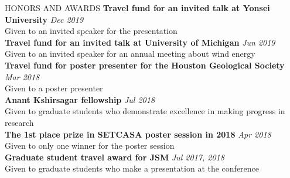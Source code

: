 \documentclass{resume} %
\begin{document}
\begin{rSection}{HONORS AND AWARDS}
{\bf Travel fund for an invited talk at Yonsei University} \hfill {\em Dec 2019} \\ 
Given to an invited speaker for the presentation
\\
{\bf Travel fund for an invited talk at University of Michigan} \hfill {\em Jun 2019} \\ 
Given to an invited speaker for an annual meeting about wind energy
\\
{\bf Travel fund for poster presenter for the Houston Geological Society} \hfill {\em Mar 2018} \\ 
Given to a poster presenter 
\\
{\bf Anant Kshirsagar fellowship} \hfill {\em Jul 2018} \\ 
Given to graduate students who demonstrate excellence in making progress in research
\\
{\bf The 1st place prize in SETCASA poster session in 2018 } \hfill {\em Apr 2018} \\ 
Given to only one winner for the poster session 
\\
{\bf Graduate student travel award for JSM} \hfill {\em Jul 2017, 2018} \\ 
Given to graduate students who make a presentation at the conference
\end{rSection}
\end{document}
